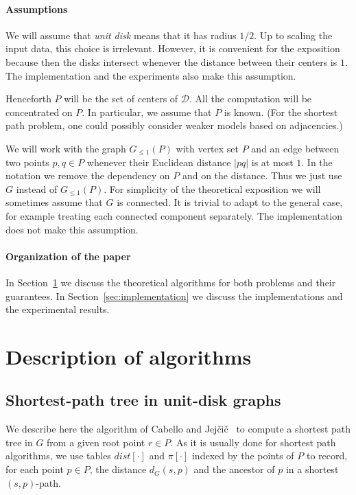 \documentclass[a4paper,11pt]{article}
\newcommand{\D}{\ensuremath{\mathcal{D}}}
\newcommand{\GG}{\ensuremath{G_{\le 1}}}
\def\dist{\mathit{dist}}
\let\le\leqslant
\begin{document}
\paragraph{Assumptions} 
We will assume that \emph{unit disk} means that it has radius $1/2$. 
Up to scaling the input data, this choice is irrelevant.
However, it is convenient for the exposition
because then the disks intersect whenever 
the distance between their centers is $1$. 
The implementation and the experiments also make this assumption.

Henceforth $P$ will be the set of centers of $\D$. 
All the computation will be concentrated on $P$. 
In particular, we assume that $P$ is known.
(For the shortest path problem, one could possibly consider weaker models based 
on adjacencies.)

We will work with the graph $\GG(P)$ with vertex set $P$ 
and an edge between two points $p,q\in P$ 
whenever their Euclidean distance $|pq|$ is at most $1$. 
In the notation we remove the dependency on $P$ and on the distance.
Thus we just use $G$ instead of $\GG(P)$.
For simplicity of the theoretical 
exposition we will sometimes assume that $G$ is connected.
It is trivial to adapt to the general case, for example
treating each connected component separately.
The implementation does not make this assumption.

\paragraph{Organization of the paper} 
In Section~\ref{sec:algorithms} we discuss the theoretical
algorithms for both problems and their guarantees.
In Section~\ref{sec:implementation} we discuss the implementations 
and the experimental results.

\section{Description of algorithms}
\label{sec:algorithms}

\subsection{Shortest-path tree in unit-disk graphs}
\label{sec:algorithm-sptree}
We describe here the algorithm of Cabello and Jej\v{c}i\v{c}~\cite{CJ15} 
to compute a shortest path tree in $G$ from a given root point $r\in P$. 
As it is usually done for shortest path algorithms, 
we use tables $\dist[\cdot]$ and $\pi[\cdot]$ indexed by the points of $P$ to record, 
for each point $p\in P$, the distance $d_{G}(s,p)$ and the ancestor of $p$ 
in a shortest $(s,p)$-path. 
\end{document}
